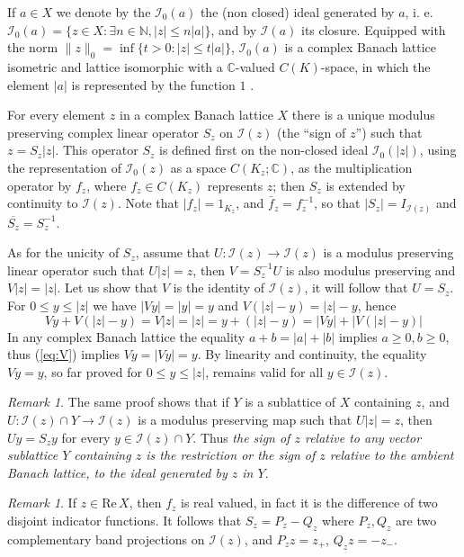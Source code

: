 \documentclass[11pt]{amsart}
\theoremstyle{plain}
\theoremstyle{remark}
\newtheorem{remark}[theorem]{Remark}
\newcommand{\I}{\mathcal I}
\renewcommand{\Re}{\mathrm {Re\,}}
\begin{document}
If $a\in X$ we denote by the $\I_0(a)$ the (non closed) ideal generated by $a$, i. e. $\I_0(a)=\{z\in X: \exists n\in \mathbb N,  |z|\le n|a|\}$, and by $\I(a)$ its closure. Equipped with the norm $\|z\|_0 =\inf\{t>0: |z|\le t|a|\}$,  $\I_0(a)$ is a complex Banach lattice isometric and lattice isomorphic with a $\mathbb C$-valued $C(K)$-space, in which the element $|a|$ is represented  by the function $1$ \cite[Cor. 3.21]{AA}.

\medskip
{}
 For every element $z$ in a complex Banach lattice $X$ there is a unique modulus preserving complex linear operator $S_z$ on $\I(z)$ (the ``sign of $z$'') such that $z=S_z |z|$. This operator $S_z$ is defined first on the non-closed ideal $\I_0(|z|)$, using the representation of $\I_0(z)$ as a space $C(K_z;\mathbb C)$, as the multiplication operator by $f_z$, where $f_z\in C(K_z)$ represents $z$; then $S_z$ is extended by continuity to $\I(z)$. Note that $|f_z|=1_{K_z}$, and $\bar f_z= f_z^{-1}$, so that  $|S_z|= I_{\I(z)}$ and $\overline{S_z}=S_z^{-1}$.
 
 As for the unicity of $S_z$, assume that $U:\mathcal I(z)\to\mathcal I(z)$ is a modulus preserving linear operator such that $U|z|=z$, then $V=S_z^{-1}U$  is also modulus preserving and $V|z|=|z|$. Let us show that $V$ is the identity of $\mathcal I(z)$, it will follow that $U=S_z$. For $0\le y\le |z|$ we have $|Vy|=|y|=y$ and $V(|z|-y)=|z|-y$, hence
\begin{equation}\label{eq:V}
 Vy+V(|z|-y)= V|z|=|z|= y+(|z|-y)=|Vy|+|V(|z|-y)|
 \end{equation}
 In any complex Banach lattice the equality $a+b=|a|+|b|$ implies $a\ge 0, b\ge 0$, thus (\ref{eq:V}) implies $Vy=|Vy|=y$.  By linearity and continuity, the equality $Vy=y$, so far proved for $0\le y\le |z|$, remains valid for all $y\in\mathcal I(z)$.
 
\begin{remark}\label{rem:sign-in-sublat}
The same proof shows that if $Y$ is a sublattice of $X$ containing $z$, and $U: \mathcal I(z)\cap Y\to\mathcal I(z)$ is a modulus preserving map such that $U|z|=z$, then $Uy=S_zy$ for every $y\in \mathcal I(z)\cap Y$. Thus {\it the sign of $z$ relative to any vector sublattice $Y$ containing $z$ is the restriction or the sign of $z$ relative to the ambient Banach lattice, to the ideal generated by $z$ in  $Y$}.
\end{remark}
\begin{remark}
If $z\in \Re X$, then $f_z$ is real valued, in fact it is the difference of two disjoint indicator functions. It follows that $S_z=P_z-Q_z$ where $P_z,Q_z$ are two complementary band projections on $\I(z)$, and $P_zz=z_+$, $Q_zz=-z_-$.
\end{remark}
 
\end{document}
